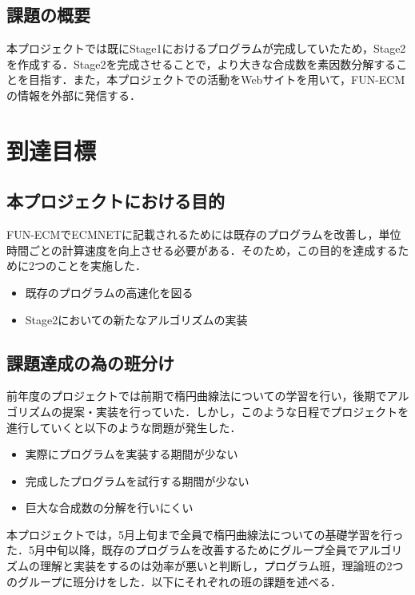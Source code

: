 \documentclass[openany,11pt,papersize]{jsbook}
\begin{document}

\section{課題の概要}\label{sec:gaiyou}

本プロジェクトでは既にStage1におけるプログラムが完成していたため，Stage2を作成する．Stage2を完成させることで，より大きな合成数を素因数分解することを目指す．また，本プロジェクトでの活動をWebサイトを用いて，FUN-ECMの情報を外部に発信する．


\chapter{到達目標}

\section{本プロジェクトにおける目的}\label{sec:mokuteki}

FUN-ECMでECMNETに記載されるためには既存のプログラムを改善し，単位時間ごとの計算速度を向上させる必要がある．そのため，この目的を達成するために2つのことを実施した．

\begin{itemize}
\item 既存のプログラムの高速化を図る
\item Stage2においての新たなアルゴリズムの実装
\end{itemize}


\section{課題達成の為の班分け}
前年度のプロジェクトでは前期で楕円曲線法についての学習を行い，後期でアルゴリズムの提案・実装を行っていた．しかし，このような日程でプロジェクトを進行していくと以下のような問題が発生した．

\begin{itemize}
\item 実際にプログラムを実装する期間が少ない
\item 完成したプログラムを試行する期間が少ない
\item 巨大な合成数の分解を行いにくい
\end{itemize}

本プロジェクトでは，5月上旬まで全員で楕円曲線法についての基礎学習を行った．5月中旬以降，既存のプログラムを改善するためにグループ全員でアルゴリズムの理解と実装をするのは効率が悪いと判断し，プログラム班，理論班の2つのグループに班分けをした．以下にそれぞれの班の課題を述べる．
\end{document}
